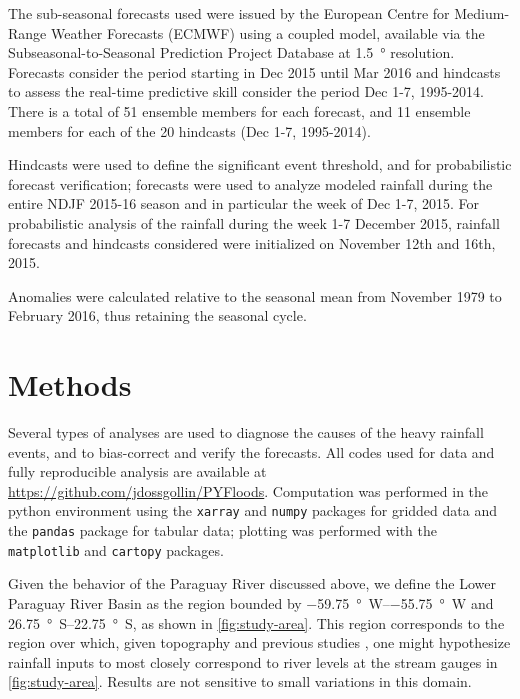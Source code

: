 \documentclass[twocol]{ametsoc}
\begin{document}
The sub-seasonal forecasts used were issued by the European Centre for Medium-Range Weather Forecasts (ECMWF) using a coupled model, available via the Subseasonal-to-Seasonal Prediction Project Database \citep{Vitart2016} at \SI{1.5}{\degree} resolution.
Forecasts consider the period starting in Dec 2015 until Mar 2016 and hindcasts to assess the real-time predictive skill consider the period Dec 1-7, 1995-2014.
There is a total of 51 ensemble members for each forecast, and 11 ensemble members for each of the 20 hindcasts (Dec 1-7, 1995-2014).

Hindcasts were used to define the significant event threshold, and for probabilistic forecast verification; forecasts were used to analyze modeled rainfall during the entire NDJF 2015-16 season and in particular the week of Dec 1-7, 2015.
For probabilistic analysis of the rainfall during the week 1-7 December 2015, rainfall forecasts and hindcasts considered were initialized on November 12th and 16th, 2015.

Anomalies were calculated relative to the seasonal mean from November 1979 to February 2016, thus retaining the seasonal cycle.


\section{Methods} \label{sec:methods}

Several types of analyses are used to diagnose the causes of the heavy rainfall events, and to bias-correct and verify the forecasts.
All codes used for data and fully reproducible analysis are available at \url{https://github.com/jdossgollin/PYFloods}.
Computation was performed in the python environment using the \texttt{xarray} \citep{hoyer2017xarray} and \texttt{numpy} \citep{vanderWalt:2011dp} packages for gridded data and the \texttt{pandas} \citep{McKinney:2010un} package for tabular data; plotting was performed with the \texttt{matplotlib} \citep{Hunter:2007ux} and \texttt{cartopy} \citep{Cartopy} packages.

Given the behavior of the Paraguay River discussed above, we define the Lower Paraguay River Basin as the region bounded by \SIrange{-59.75}{-55.75}{\degree W} and \SIrange{26.75}{22.75}{\degree S}, as shown in \cref{fig:study-area}.
This region corresponds to the region over which, given topography and previous studies \citep{Barros:2004bn,Bravo:2011et}, one might hypothesize rainfall inputs to most closely correspond to river levels at the stream gauges in \cref{fig:study-area}.
Results are not sensitive to small variations in this domain.
\end{document}
